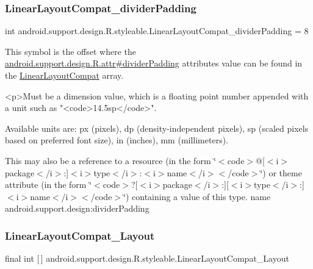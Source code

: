 \subsubsection{\texorpdfstring{Linear\+Layout\+Compat\+\_\+divider\+Padding}{LinearLayoutCompat\_dividerPadding}}
{\footnotesize\ttfamily int android.\+support.\+design.\+R.\+styleable.\+Linear\+Layout\+Compat\+\_\+divider\+Padding = 8\hspace{0.3cm}{\ttfamily [static]}}

This symbol is the offset where the \hyperlink{classandroid_1_1support_1_1design_1_1R_1_1attr_a344833a38d52ba02220b6702dbb39081}{android.\+support.\+design.\+R.\+attr\#divider\+Padding} attribute\textquotesingle{}s value can be found in the \hyperlink{classandroid_1_1support_1_1design_1_1R_1_1styleable_a00b7e2da5bc1f659d80ac76716119713}{Linear\+Layout\+Compat} array.

\begin{DoxyVerb}      <p>Must be a dimension value, which is a floating point number appended with a unit such as "<code>14.5sp</code>".
\end{DoxyVerb}
 Available units are\+: px (pixels), dp (density-\/independent pixels), sp (scaled pixels based on preferred font size), in (inches), mm (millimeters). 

This may also be a reference to a resource (in the form \char`\"{}$<$code$>$@\mbox{[}$<$i$>$package$<$/i$>$\+:\mbox{]}$<$i$>$type$<$/i$>$\+:$<$i$>$name$<$/i$>$$<$/code$>$\char`\"{}) or theme attribute (in the form \char`\"{}$<$code$>$?\mbox{[}$<$i$>$package$<$/i$>$\+:\mbox{]}\mbox{[}$<$i$>$type$<$/i$>$\+:\mbox{]}$<$i$>$name$<$/i$>$$<$/code$>$\char`\"{}) containing a value of this type.  name android.\+support.\+design\+:divider\+Padding \mbox{\label{classandroid_1_1support_1_1design_1_1R_1_1styleable_aa15b34677245387b51b9ce8ce236e56a}} 
\subsubsection{\texorpdfstring{Linear\+Layout\+Compat\+\_\+\+Layout}{LinearLayoutCompat\_Layout}}
{\footnotesize\ttfamily final int \mbox{[}$\,$\mbox{]} android.\+support.\+design.\+R.\+styleable.\+Linear\+Layout\+Compat\+\_\+\+Layout\hspace{0.3cm}{\ttfamily [static]}}

